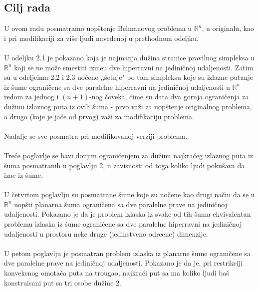\documentclass[11pt,letter]{article}
\begin{document}
\subsection[Cilj rada]{Cilj rada}
\bigskip
U ovom radu posmatramo uop\v stenje Belmanovog problema u $\mathbb{R}^n$, u originalu, kao i pri modifikaciji za vi\v se ljudi navedenoj u prethodnom odeljku.
\\
\\
\indent U odeljku 2.1 je pokazano koja je najmanja du\v zina stranice pravilnog simpleksa u $\mathbb{R}^n$ koji se ne mo\v ze smestiti izme\dj u dve hiperravni na jedini\v cnoj udaljenosti. Zatim su u odeljcima 2.2 i 2.3  uo\v cene ,,\v setnje" po tom simpleksu koje su izlazne putanje iz \v sume ograni\v cene sa dve paralelne hiperravni na jedini\v cnoj udaljenosti u $\mathbb{R}^n$ redom za jednog i $(n+1)$-nog \v coveka, \v cime su data dva gornja ograni\v cenja za du\v zinu izlaznog puta iz ovih \v suma - prvo va\v zi za uop\v stenje originalnog problema, a drugo (koje je ja\v ce od prvog) va\v zi za modifikaciju problema. 
\\
\\
\indent Nadalje se sve posmatra pri modifikovanoj verziji problema.
\\
\\
\indent Tre\' ce poglavlje se bavi donjim ograni\v cenjem za du\v zinu najkra\' ceg izlaznog puta iz \v suma posmatranih u poglavlju 2, u zavisnosti od toga koliko ljudi poku\v sava da iza\dj e iz \v sume.
\\
\\
\indent U \v cetvrtom poglavlju su posmatrane \v sume koje su uo\v cene kao drugi na\v cin da se u $\mathbb{R}^n$ uop\v sti planarna \v suma ograni\v cena sa dve paralelne prave na jedini\v cnoj udaljenosti. Pokazano je da je problem izlaska iz svake od tih \v suma ekvivalentan problemu izlaska iz \v sume ograni\v cene sa dve paralelne hiperravni na jedini\v cnoj udaljenosti u prostoru neke druge (jedinstveno odre\dj ene) dimenzije.
\\
\\
\indent U petom poglavlju je posmatran problem izlaska iz planarne \v sume ograni\v cene sa dve paralelne prave na jedini\v cnoj udaljenosti. Pokazano je da je, pri restrikciji konveksnog omota\v ca puta na trougao, najkra\' ci put sa ma koliko ljudi ba\v s konstruisani put sa tri osobe du\v zine 2.
\\
\end{document}
